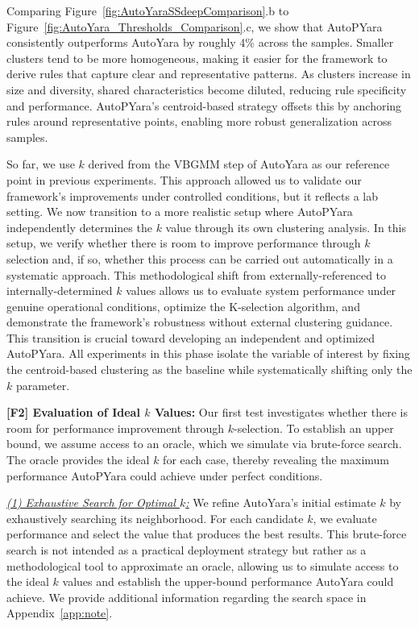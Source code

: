 \noindent Comparing Figure~\ref{fig:AutoYaraSSdeepComparison}.b to Figure~\ref{fig:AutoYara_Thresholds_Comparison}.c, we show that AutoPYara consistently outperforms AutoYara by roughly 4\% across the samples. Smaller clusters tend to be more homogeneous, making it easier for the framework to derive rules that capture clear and representative patterns. As clusters increase in size and diversity, shared characteristics become diluted, reducing rule specificity and performance. AutoPYara’s centroid-based strategy offsets this by anchoring rules around representative points, enabling more robust generalization across samples.

 So far, we use $k$ derived from the VBGMM step of AutoYara as our reference point in previous experiments. This approach allowed us to validate our framework's improvements under controlled conditions, but it reflects a lab setting. We now transition to a more realistic setup where AutoPYara independently determines the $k$ value through its own clustering analysis. In this setup, we verify whether there is room to improve performance through $k$ selection and, if so, whether this process can be carried out automatically in a systematic approach. This methodological shift from externally-referenced to internally-determined $k$ values allows us to evaluate system performance under genuine operational conditions, optimize the K-selection algorithm, and demonstrate the framework's robustness without external clustering guidance. This transition is crucial toward developing an independent and optimized AutoPYara. All experiments in this phase isolate the variable of interest by fixing the centroid-based clustering as the baseline while systematically shifting only the $k$ parameter.

\noindent\textbf{[F2] Evaluation of Ideal $k$ Values:} Our first test investigates whether there is room for performance improvement through $k$-selection. To establish an upper bound, we assume access to an oracle, which we simulate via brute-force search. The oracle provides the ideal $k$ for each case, thereby revealing the maximum performance AutoPYara could achieve under perfect conditions.

\noindent\underline{\textit{(1) Exhaustive Search for Optimal $k$:}} We refine AutoYara’s initial estimate $k$ by exhaustively searching its neighborhood. For each candidate $k$, we evaluate performance and select the value that produces the best results. This brute-force search is not intended as a practical deployment strategy but rather as a methodological tool to approximate an oracle, allowing us to simulate access to the ideal $k$ values and establish the upper-bound performance AutoYara could achieve. We provide additional information regarding the search space in Appendix~\ref{app:note}.

